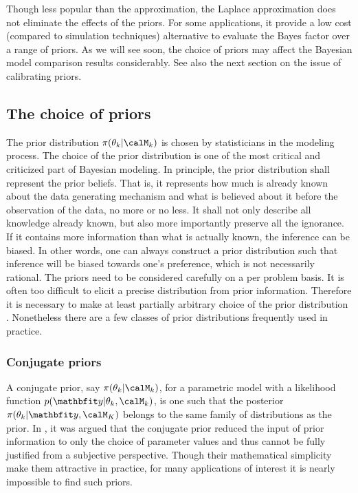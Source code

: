 Though less popular than the \bic approximation, the Laplace approximation
does not eliminate the effects of the priors. For some applications, it
provide a low cost (compared to simulation techniques) alternative to evaluate
the Bayes factor over a range of priors. As we will see soon, the choice of
priors may affect the Bayesian model comparison results considerably. See also
the next section on the issue of calibrating priors.

\subsection{The choice of priors}
\label{sub:The choice of priors}

The prior distribution $\pi(\theta_k|\calM_k)$ is chosen by statisticians in
the modeling process. The choice of the prior distribution is one of the most
critical and criticized part of Bayesian modeling. In principle, the prior
distribution shall represent the prior beliefs. That is, it represents how
much is already known about the data generating mechanism and what is believed
about it before the observation of the data, no more or no less. It shall not
only describe all knowledge already known, but also more importantly preserve
all the ignorance. If it contains more information than what is actually
known, the inference can be biased. In other words, one can always construct a
prior distribution such that inference will be biased towards one's
preference, which is not necessarily rational. The priors need to be
considered carefully on a per problem basis. It is often too difficult to
elicit a precise distribution from prior information. Therefore it is
necessary to make at least partially arbitrary choice of the prior
distribution \cite[][chap.~3]{Robert:2007tc}\cite{Kass:1995vb}. Nonetheless
there are a few classes of prior distributions frequently used in practice.

\subsubsection{Conjugate priors}
\label{ssub:Conjugate priors}

A conjugate prior, say $\pi(\theta_k|\calM_k)$, for a parametric model with a
likelihood function $p(\data|\theta_k,\calM_k)$, is one such that the
posterior $\pi(\theta_k|\data,\calM_K)$ belongs to the same family of
distributions as the prior. In \cite[][sec.~5.2]{Bernardo:1994vd}, it was
argued that the conjugate prior reduced the input of prior information to only
the choice of parameter values and thus cannot be fully justified from a
subjective perspective. Though their mathematical simplicity make them
attractive in practice, for many applications of interest it is nearly
impossible to find such priors.

